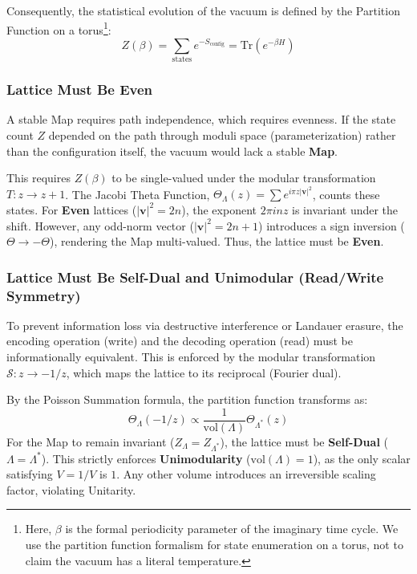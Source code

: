 Consequently, the statistical evolution of the vacuum is defined by the Partition Function on a torus\footnote{Here, $\beta$ is the formal periodicity parameter of the imaginary time cycle. We use the partition function formalism for state enumeration on a torus, not to claim the vacuum has a literal temperature.}:
\begin{equation}
    Z(\beta) = \sum_{\text{states}} e^{-S_{\text{config}}} = \text{Tr}(e^{-\beta H})
\end{equation}

\subsubsection{Lattice Must Be Even}
\label{sec:even}
A stable Map requires path independence, which requires evenness. If the state count $Z$ depended on the path through moduli space (parameterization) rather than the configuration itself, the vacuum would lack a stable \textbf{Map}.

This requires $Z(\beta)$ to be single-valued under the modular transformation $T: z \to z+1$. The Jacobi Theta Function, $\Theta_\Lambda(z) = \sum e^{i \pi z |\mathbf{v}|^2}$, counts these states. For \textbf{Even} lattices ($|\mathbf{v}|^2 = 2n$), the exponent $2\pi i n z$ is invariant under the shift. However, any odd-norm vector ($|\mathbf{v}|^2 = 2n+1$) introduces a sign inversion ($\Theta \to -\Theta$), rendering the Map multi-valued. Thus, the lattice must be \textbf{Even}.

\subsubsection{Lattice Must Be Self-Dual and Unimodular (Read/Write Symmetry)}
To prevent information loss via destructive interference or Landauer erasure, the encoding operation (write) and the decoding operation (read) must be informationally equivalent. This is enforced by the modular transformation $\mathcal{S}: z \to -1/z$, which maps the lattice to its reciprocal (Fourier dual).

By the Poisson Summation formula, the partition function transforms as:
\begin{equation}
    \Theta_\Lambda(-1/z) \propto \frac{1}{\text{vol}(\Lambda)} \Theta_{\Lambda^*}(z)
\end{equation}
For the Map to remain invariant ($Z_{\Lambda} = Z_{\Lambda^*}$), the lattice must be \textbf{Self-Dual} ($\Lambda = \Lambda^*$). This strictly enforces \textbf{Unimodularity} ($\text{vol}(\Lambda) = 1$), as the only scalar satisfying $V = 1/V$ is $1$. Any other volume introduces an irreversible scaling factor, violating Unitarity.


